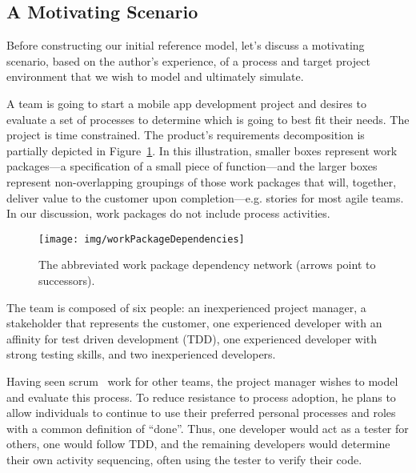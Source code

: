 \subsection{A Motivating Scenario}\label{sec:scenario}
Before constructing our initial reference model, let's discuss a motivating
scenario, based on the author's experience, of a process and target project
environment that we wish to model and ultimately simulate.

A team is going to start a mobile app development project and desires to
evaluate a set of processes to determine which is going to best fit their needs.
The project is time constrained.  The product's requirements decomposition is
partially depicted in Figure~\ref{fig:dependencyNetwork}.  In this illustration,
smaller boxes represent work packages---a specification of a small piece of
function---and the larger boxes represent non-overlapping groupings of those
work packages that will, together, deliver value to the customer upon
completion---e.g. stories for most agile teams.  In our discussion, work
packages do not include process activities.  

\begin{figure}[htb]
    \centering
        \texttt{[image: img/workPackageDependencies]}
    \caption{The abbreviated work package dependency network (arrows point to
        successors).}
    \label{fig:dependencyNetwork}
\end{figure}


The team is composed of six people: an inexperienced project manager, a
stakeholder that represents the customer, one experienced developer with an
affinity for test driven development (TDD), one experienced developer with
strong testing skills, and two inexperienced developers.

Having seen scrum~\cite{rubin_essential_2012} work for other teams, the project
manager wishes to model and evaluate this process.  To reduce
resistance to process adoption, he plans to allow individuals to continue
to use their preferred personal processes and roles with a common definition of
``done''.  Thus, one developer would act as a tester for others, one would
follow TDD, and the remaining developers would determine their own activity
sequencing, often using the tester to verify their code.

